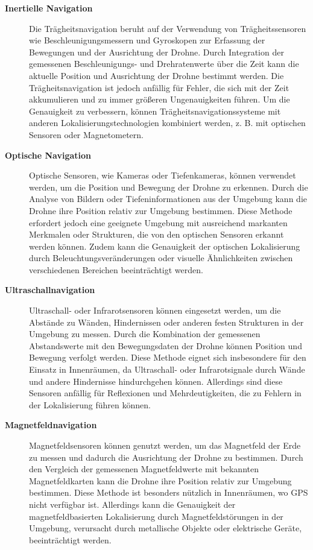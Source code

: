 \begin{description} \label{lst:navigation-types}
    \item [\textbf{Inertielle Navigation}] Die Trägheitsnavigation beruht auf der Verwendung von Trägheitssensoren wie Beschleunigungsmessern und Gyroskopen zur Erfassung der Bewegungen und der Ausrichtung der Drohne. Durch Integration der gemessenen Beschleunigungs- und Drehratenwerte über die Zeit kann die aktuelle Position und Ausrichtung der Drohne bestimmt werden. Die Trägheitsnavigation ist jedoch anfällig für Fehler, die sich mit der Zeit akkumulieren und zu immer größeren Ungenauigkeiten führen. Um die Genauigkeit zu verbessern, können Trägheitsnavigationssysteme mit anderen Lokalisierungstechnologien kombiniert werden, z. B. mit optischen Sensoren oder Magnetometern.

    \item [\textbf{Optische Navigation}] Optische Sensoren, wie Kameras oder Tiefenkameras, können verwendet werden, um die Position und Bewegung der Drohne zu erkennen. Durch die Analyse von Bildern oder Tiefeninformationen aus der Umgebung kann die Drohne ihre Position relativ zur Umgebung bestimmen. Diese Methode erfordert jedoch eine geeignete Umgebung mit ausreichend markanten Merkmalen oder Strukturen, die von den optischen Sensoren erkannt werden können. Zudem kann die Genauigkeit der optischen Lokalisierung durch Beleuchtungsveränderungen oder visuelle Ähnlichkeiten zwischen verschiedenen Bereichen beeinträchtigt werden.

    \item [\textbf{Ultraschallnavigation}] Ultraschall- oder Infrarotsensoren können eingesetzt werden, um die Abstände zu Wänden, Hindernissen oder anderen festen Strukturen in der Umgebung zu messen. Durch die Kombination der gemessenen Abstandswerte mit den Bewegungsdaten der Drohne können Position und Bewegung verfolgt werden. Diese Methode eignet sich insbesondere für den Einsatz in Innenräumen, da Ultraschall- oder Infrarotsignale durch Wände und andere Hindernisse hindurchgehen können. Allerdings sind diese Sensoren anfällig für Reflexionen und Mehrdeutigkeiten, die zu Fehlern in der Lokalisierung führen können.

    \item [\textbf{Magnetfeldnavigation}] Magnetfeldsensoren können genutzt werden, um das Magnetfeld der Erde zu messen und dadurch die Ausrichtung der Drohne zu bestimmen. Durch den Vergleich der gemessenen Magnetfeldwerte mit bekannten Magnetfeldkarten kann die Drohne ihre Position relativ zur Umgebung bestimmen. Diese Methode ist besonders nützlich in Innenräumen, wo \ac{GPS} nicht verfügbar ist. Allerdings kann die Genauigkeit der magnetfeldbasierten Lokalisierung durch Magnetfeldstörungen in der Umgebung, verursacht durch metallische Objekte oder elektrische Geräte, beeinträchtigt werden.


\end{description}

